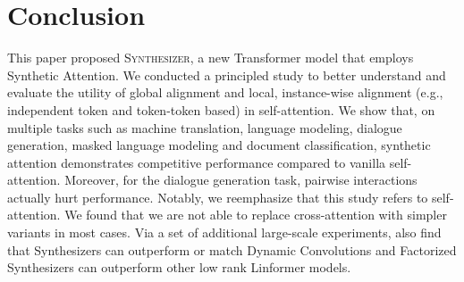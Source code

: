 \section{Conclusion}
This paper proposed \textsc{Synthesizer}, a new Transformer model that employs Synthetic Attention. We conducted a principled study to better understand and evaluate the utility of global alignment and local, instance-wise alignment (e.g., independent token and token-token based) in self-attention. We show that, on multiple tasks such as machine translation, language modeling, dialogue generation, masked language modeling and document classification, synthetic attention demonstrates competitive performance compared to vanilla self-attention. Moreover, for the dialogue generation task, pairwise interactions actually hurt performance. Notably, we reemphasize that this study refers to self-attention. We found that we are not able to replace cross-attention with simpler variants in most cases. Via a set of additional large-scale experiments, also find that Synthesizers can outperform or match Dynamic Convolutions and Factorized Synthesizers can outperform other low rank Linformer models.

\nocite{langley00}


